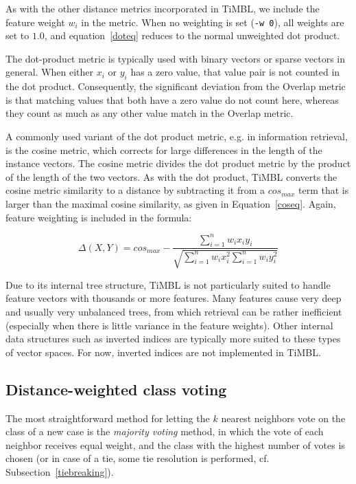 \documentclass{book}
\begin{document}
As with the other distance metrics incorporated in TiMBL, we include
the feature weight $w_{i}$ in the metric. When no weighting is set
({\tt -w 0}), all weights are set to $1.0$, and equation~\ref{doteq}
reduces to the normal unweighted dot product.

The dot-product metric is typically used with binary vectors or sparse 
vectors in general. When either $x_{i}$ or $y_{i}$ has a zero value, that 
value pair is not counted in the dot product. Consequently, the significant 
deviation from the Overlap metric is that matching values that both have a 
zero value do not count here, whereas they count as much as any other value 
match in the Overlap metric.

A commonly used variant of the dot product metric, e.g. in information
retrieval, is the cosine metric, which corrects for large differences
in the length of the instance vectors. The cosine metric divides the
dot product metric by the product of the length of the two vectors. As
with the dot product, TiMBL converts the cosine metric similarity to a
distance by subtracting it from a $cos_{max}$ term that is larger than
the maximal cosine similarity, as given in
Equation~\ref{coseq}. Again, feature weighting is included in the
formula:

\begin{equation}
\label{coseq}
\Delta(X,Y) = cos_{max} - \frac{\sum_{i=1}^{n} w_{i} x_{i} y_{i}}{\sqrt{\sum_{i=1}^{n} w_{i} x_{i}^2 \sum_{i=1}^{n} w_{i} y_{i}^2}}
\end{equation}

Due to its internal tree structure, TiMBL is not particularly suited
to handle feature vectors with thousands or more features. Many features
cause very deep and usually very unbalanced trees, from which
retrieval can be rather inefficient (especially when there is little
variance in the feature weights). Other internal data structures such as
inverted indices are typically more suited to these types of vector
spaces. For now, inverted indices are not implemented in TiMBL.

\subsection{Distance-weighted class voting}
\label{distweightvote}

The most straightforward method for letting the $k$ nearest neighbors
vote on the class of a new case is the {\em majority voting} method,
in which the vote of each neighbor receives equal weight, and the
class with the highest number of votes is chosen (or in case of a tie,
some tie resolution is performed, cf. Subsection~\ref{tiebreaking}).
\end{document}

